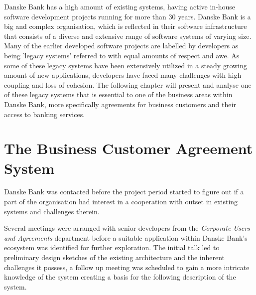 Danske Bank has a high amount of existing systems, having active in-house software development projects running for more than 30 years. Danske Bank is a big and complex organisation, which is reflected in their software infrastructure that consists of a diverse and extensive range of software systems of varying size. Many of the earlier developed software projects are labelled by developers as being 'legacy systems' referred to with equal amounts of respect and awe. As some of these legacy systems have been extensively utilized in a steady growing amount of new applications, developers have faced many challenges with high coupling and loss of cohesion. The following chapter will present and analyse one of these legacy systems that is essential to one of the business areas within Danske Bank, more specifically agreements for business customers and their access to banking services.

\section{The Business Customer Agreement System}
Danske Bank was contacted before the project period started to figure out if a part of the organisation had interest in a cooperation with outset in existing systems and challenges therein. 

Several meetings were arranged with senior developers from the \textit{Corporate Users and Agreements} department before a suitable application within Danske Bank's ecosystem was identified for further exploration. The initial talk led to preliminary design sketches of the existing architecture and the inherent challenges it possess, a follow up meeting was scheduled to gain a more intricate knowledge of the system creating a basis for the following description of the system.

